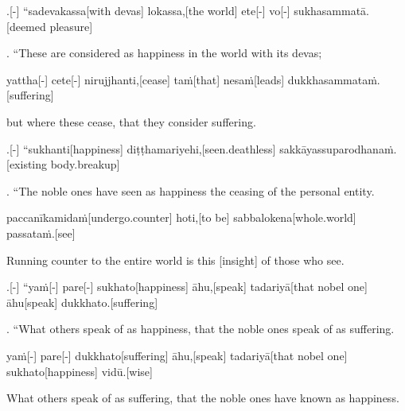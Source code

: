 \begin{samepage}
.[-] “sadevakassa[with devas] lokassa,[the world] ete[-] vo[-] sukhasammatā.[deemed pleasure]
\endgl
\nopagebreak
\linespread{0.5}
\begin{spacin}{0.2}
{. “These are considered as happiness in the world with its devas;}
\end{spacin}
\vskip 12pt
\end{samepage}
\begin{samepage}
\begingl[glneveryline={\PaliGlossA,\PaliGlossB}]
yattha[-] cete[-] nirujjhanti,[cease] taṁ[that] nesaṁ[leads] dukkhasammataṁ.[suffering]
\endgl
\nopagebreak
\linespread{0.5}
\begin{spacin}{0.2}
{\PaliGlossFT but where these cease,  that they consider suffering.}
\end{spacin}
\vskip 12pt
\end{samepage}
\begin{samepage}
.[-] “sukhanti[happiness] diṭṭhamariyehi,[seen.deathless] sakkāyassuparodhanaṁ.[existing body.breakup]
\endgl
\nopagebreak
\linespread{0.5}
\begin{spacin}{0.2}
{. “The noble ones have seen as happiness the ceasing of the personal entity.}
\end{spacin}
\vskip 12pt
\end{samepage}
\begin{samepage}
\begingl[glneveryline={\PaliGlossA,\PaliGlossB}]
paccanīkamidaṁ[undergo.counter] hoti,[to be] sabbalokena[whole.world] passataṁ.[see]
\endgl
\nopagebreak
\linespread{0.5}
\begin{spacin}{0.2}
{\PaliGlossFT Running counter to the entire world  is this [insight] of those who see.}
\end{spacin}
\vskip 12pt
\end{samepage}
\begin{samepage}
.[-] “yaṁ[-] pare[-] sukhato[happiness] āhu,[speak] tadariyā[that nobel one] āhu[speak] dukkhato.[suffering]
\endgl
\nopagebreak
\linespread{0.5}
\begin{spacin}{0.2}
{. “What others speak of as happiness,  that the noble ones speak of as suffering.}
\end{spacin}
\vskip 12pt
\end{samepage}
\begin{samepage}
\begingl[glneveryline={\PaliGlossA,\PaliGlossB}]
yaṁ[-] pare[-] dukkhato[suffering] āhu,[speak] tadariyā[that nobel one] sukhato[happiness] vidū.[wise]
\endgl
\nopagebreak
\linespread{0.5}
\begin{spacin}{0.2}
{\PaliGlossFT What others speak of as suffering,  that the noble ones have known as happiness.}
\end{spacin}
\vskip 12pt
\end{samepage}
